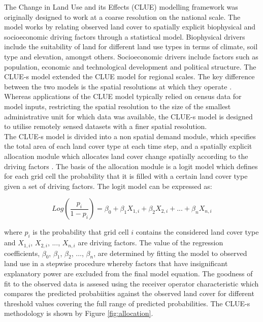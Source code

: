 \documentclass{icldt}\usepackage[]{graphicx}\usepackage[]{color}
\begin{document}
The Change in Land Use and its Effects (CLUE) modelling framework \citep{Veldkamp1996} was originally designed to work at a coarse resolution on the national scale. The model works by relating observed land cover to spatially explicit biophysical and socioeconomic driving factors through a statistical model. Biophysical drivers include the suitability of land for different land use types in terms of climate, soil type and elevation, amongst others. Socioeconomic drivers include factors such as population, economic and technological development and political structure. The CLUE-s model \citep{Verburg2004,Verburg2002} extended the CLUE model for regional scales. The key difference between the two models is the spatial resolutions at which they operate \citep{Verburg2002}. Whereas applications of the CLUE model \citep[e.g.][]{Veldkamp1996,Verburg1999} typically relied on census data for model inputs, restricting the spatial resolution to the size of the smallest administrative unit for which data was available, the CLUE-s model is designed to utilise remotely sensed datasets with a finer spatial resolution. \\

The CLUE-s model is divided into a non spatial demand module, which specifies the total area of each land cover type at each time step, and a spatially explicit allocation module which allocates land cover change spatially according to the driving factors \citep{Verburg2002}. The basis of the allocation module is a logit model which defines for each grid cell the probability that it is filled with a certain land cover type given a set of driving factors. The logit model can be expressed as:

\begin{equation} \label{eq:logit}
Log\left(\frac{p_{i}}{1-p_{i}}\right) = \beta_{0} + \beta_{1} X_{1,i} + \beta_{2} X_{2,i} + ... + \beta_{n} X_{n,i}
\end{equation} 

\noindent where $ p_{i} $ is the probability that grid cell $ i $ contains the considered land cover type and $ X_{1,i} $, $ X_{2,i} $, ..., $ X_{n,i} $ are driving factors. The value of the regression coefficients, $ \beta_{0} $, $ \beta_{1} $, $ \beta_{2} $, $ ... $, $ \beta_{n} $, are determined by fitting the model to observed land use in a stepwise procedure whereby factors that have insignificant explanatory power are excluded from the final model equation. The goodness of fit to the observed data is assesed using the receiver operator characteristic \citep{Pontius2001} which compares the predicted probabiities against the observed land cover for different threshold values covering the full range of predicted probabilities. The CLUE-s methodology is shown by Figure \ref{fig:allocation}. \\
\end{document}
